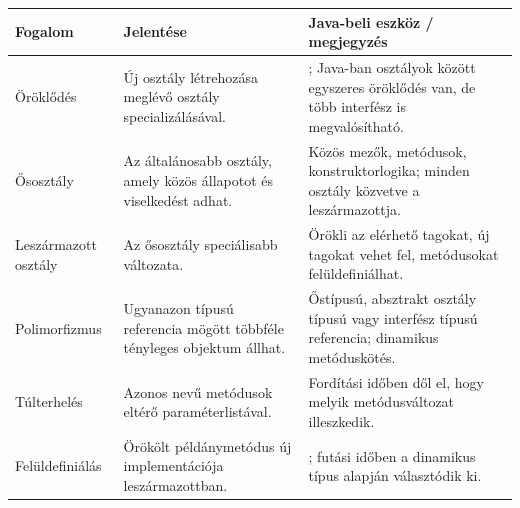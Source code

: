 \begin{tabularx}{\textwidth}{L{34mm}X X}
\toprule
\textbf{Fogalom} & \textbf{Jelentése} & \textbf{Java-beli eszköz / megjegyzés} \\
\midrule
Öröklődés & Új osztály létrehozása meglévő osztály specializálásával. & ; Java-ban osztályok között egyszeres öröklődés van, de több interfész is megvalósítható. \\
Ősosztály & Az általánosabb osztály, amely közös állapotot és viselkedést adhat. & Közös mezők, metódusok, konstruktorlogika; minden osztály közvetve a  leszármazottja. \\
Leszármazott osztály & Az ősosztály speciálisabb változata. & Örökli az elérhető tagokat, új tagokat vehet fel, metódusokat felüldefiniálhat. \\
Polimorfizmus & Ugyanazon típusú referencia mögött többféle tényleges objektum állhat. & Őstípusú, absztrakt osztály típusú vagy interfész típusú referencia; dinamikus metóduskötés. \\
Túlterhelés & Azonos nevű metódusok eltérő paraméterlistával. & Fordítási időben dől el, hogy melyik metódusváltozat illeszkedik. \\
Felüldefiniálás & Örökölt példánymetódus új implementációja leszármazottban. & ; futási időben a dinamikus típus alapján választódik ki. \\
\bottomrule
\end{tabularx}
